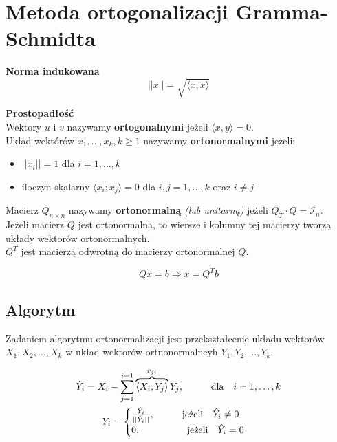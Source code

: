\documentclass[../mn-notatki.tex]{subfiles}
\begin{document}
\section{Metoda ortogonalizacji Gramma-Schmidta}

\begin{tcolorbox}
\textbf{Norma indukowana}
\[
||x|| = \sqrt{\langle x,x \rangle}
\]
\end{tcolorbox}

\begin{tcolorbox}
\textbf{Prostopadłość}\\
Wektory $u$ i $v$ nazywamy \textbf{ortogonalnymi} jeżeli $\langle x,y \rangle = 0$.\\
Układ wektórów $x_1, \ldots, x_k, k \geqslant 1$ nazywamy \textbf{ortonormalnymi}
jeżeli:
\begin{itemize}
    \item $||x_i|| = 1$ dla $i = 1, \ldots, k$
    \item iloczyn skalarny $\langle x_i; x_j \rangle = 0$ dla $i,j = 1, \ldots, k$ oraz $i \neq j$
\end{itemize}
\end{tcolorbox}

\begin{tcolorbox}
Macierz $Q_{n\times n}$ nazywamy \textbf{ortonormalną} \textit{(lub unitarną)}
jeżeli $Q_T \cdot Q = \mathcal{I}_n$.\\

Jeżeli macierz $Q$ jest ortonormalna, to wiersze i kolumny tej macierzy
tworzą układy wektorów ortonormalnych.\\

$Q^T$ jest macierzą odwrotną do macierzy ortonormalnej $Q$.
\end{tcolorbox}

\begin{tcolorbox}
\[
Qx = b \Rightarrow x = Q^T b
\]
\end{tcolorbox}

\subsection{Algorytm}
\begin{tcolorbox}
Zadaniem algorytmu ortonormalizacji jest przekształcenie układu
wektorów $X_1 ,X_2 ,\ldots,X_k$ w układ wektorów ortnonormalncyh $Y_1 ,Y_2 ,\ldots,Y_k$.
\end{tcolorbox}

\begin{gather*}
\hat{Y}_i = X_i - \sum_{j=1}^{i-1} \overbrace{\langle X_i; Y_j \rangle}^{r_{ji}} Y_j, \hspace*{1cm} \text{dla~~ } i = 1, \ldots, k\\
Y_i =
\begin{cases}
\frac{\hat{Y}_i}{||\hat{Y}_i|| }, \hspace*{1cm} \text{jeżeli~~ } \hat{Y}_i \neq 0\\
0, \hspace*{1cm} \text{~~~~~~jeżeli~~ } \hat{Y}_i = 0
\end{cases}
\end{gather*}
\end{document}
